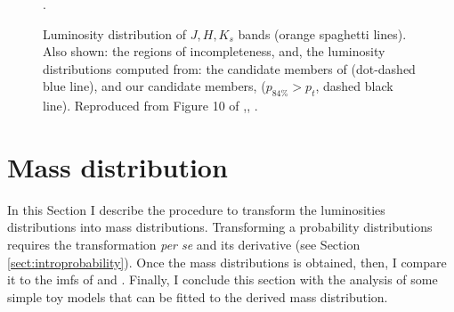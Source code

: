 \begin{figure}[htbp]
\begin{center}
\caption{Luminosity distribution of $J,H,K_s$ bands (orange spaghetti lines). Also shown: the regions of incompleteness, and, the luminosity distributions computed from: the candidate members of \citet{Bouy2015} (dot-dashed blue line), and our candidate members, ($p_{84\%}>p_t$, dashed black line). Reproduced from Figure 10 of \citet{Olivares2017},\textit{},  .}
\label{fig:Luminosities}.
\end{center}
\end{figure}

\section{Mass distribution}
\label{sect:massdistributionresults}

In this Section I describe the procedure to transform the luminosities distributions into mass distributions. Transforming a  probability distributions requires the transformation \emph{per se} and its derivative (see Section \ref{sect:introprobability}). Once the mass distributions is obtained,  then, I compare it to the \glspl{imf} of \citet{Chabrier2005} and \citet{Thies2007}. Finally, I conclude this section with the analysis of some simple toy models that can be fitted to the derived mass distribution.

